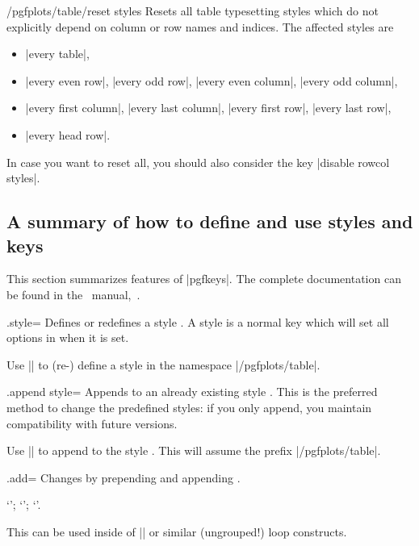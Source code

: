 \begin{key}{/pgfplots/table/reset styles}
	Resets all table typesetting styles which do not explicitly depend on column or row names and indices. The affected styles are
	\begin{itemize}
		\item |every table|,
		\item |every even row|, |every odd row|, |every even column|, |every odd column|,
		\item |every first column|, |every last column|, |every first row|, |every last row|,
		\item |every head row|.
	\end{itemize}
	In case you want to reset all, you should also consider the key |disable rowcol styles|.
\end{key}

\subsection{A summary of how to define and use styles and keys}
This section summarizes features of |pgfkeys|. The complete documentation can be found in the \pgfname\ manual,~\cite{tikz}.
\begin{handler}{{.style}=}
	Defines or redefines a style . A style is a normal key which will set all options in  when it is set.

	Use	|| to (re-) define a style  in the namespace |/pgfplots/table|.
\end{handler}

\begin{handler}{{.append style}=}
	Appends  to an already existing style . This is the preferred method to change the predefined styles: if you only append, you maintain compatibility with future versions.

	Use	|| to append  to the style . This will assume the prefix |/pgfplots/table|.
\end{handler}

\begin{handler}{{.add}=}
	Changes  by prepending  and appending .
\begin{codeexample}[]
`';
`';
`'.
\end{codeexample}
	This can be used inside of |\pgfplotsinvokeforeach| or similar (ungrouped!) loop constructs.
\end{handler}

